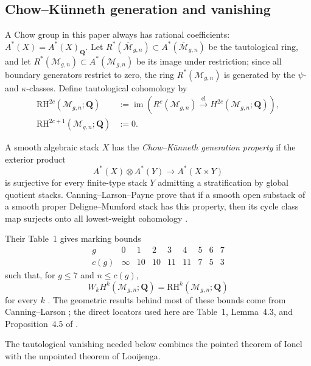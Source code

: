 \documentclass[12pt,reqno]{amsart}
\newcommand{\Q}{\mathbf{Q}}
\newcommand{\M}{\mathcal{M}}
\newcommand{\Mbar}{\overline{\mathcal{M}}}
\newcommand{\RH}{\mathrm{RH}}
\newcommand{\im}{\operatorname{im}}
\theoremstyle{definition}
\theoremstyle{remark}
\begin{document}
\subsection{Chow--K\"unneth generation and vanishing}

A Chow group in this paper always has rational coefficients:
$A^*(X)=A^*(X)_{\Q}$.  Let $R^*(\Mbar_{g,n})\subset A^*(\Mbar_{g,n})$ be the
tautological ring, and let $R^*(\M_{g,n})\subset A^*(\M_{g,n})$ be its image
under restriction; since all boundary generators restrict to zero, the ring
$R^*(\M_{g,n})$ is generated by the $\psi$- and $\kappa$-classes.  Define
tautological cohomology by
\begin{equation}\label{eq:RH-definition}
 \begin{aligned}
 \RH^{2c}(\M_{g,n};\Q)
 &:=\im\!\left(R^c(\M_{g,n})\xrightarrow{\mathrm{cl}}
 H^{2c}(\M_{g,n};\Q)\right),\\
 \RH^{2c+1}(\M_{g,n};\Q)&:=0.
 \end{aligned}
\end{equation}

A smooth algebraic stack $X$ has the \emph{Chow--K\"unneth generation
property} if the exterior product
\[
 A^*(X)\otimes A^*(Y)\longrightarrow A^*(X\times Y)
\]
is surjective for every finite-type stack $Y$ admitting a stratification by
global quotient stacks.  Canning--Larson--Payne prove that if a smooth open
substack of a smooth proper Deligne--Mumford stack has this property, then
its cycle class map surjects onto all lowest-weight cohomology
\cite[Lemma~4.3]{CLP}.

Their Table~1 gives marking bounds
\begin{equation}\label{eq:c-table}
\begin{array}{c|cccccccc}
g&0&1&2&3&4&5&6&7\\ \hline
c(g)&\infty&10&10&11&11&7&5&3
\end{array}
\end{equation}
such that, for $g\leq7$ and $n\leq c(g)$,
\begin{equation}\label{eq:CLP-pure-taut}
 W_kH^k(\M_{g,n};\Q)=\RH^k(\M_{g,n};\Q)
\end{equation}
for every $k$ \cite[Proposition~4.5]{CLP}.  The geometric results behind most
of these bounds come from Canning--Larson \cite{CanningLarsonStable}; the
direct locators used here are Table~1, Lemma~4.3, and Proposition~4.5 of
\cite{CLP}.

The tautological vanishing needed below combines the pointed theorem of
Ionel with the unpointed theorem of Looijenga.
\end{document}
